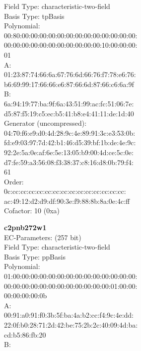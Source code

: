 Field Type: characteristic-two-field\\
Basis Type: tpBasis\\
Polynomial:\\
    00:80:00:00:00:00:00:00:00:00:00:00:00:00:00:\\
    00:00:00:00:00:00:00:00:00:00:00:10:00:00:00:\\
    01\\
A:   \\
    01:23:87:74:66:6a:67:76:6d:66:76:f7:78:e6:76:\\
    b6:69:99:17:66:66:e6:87:66:6d:87:66:c6:6a:9f\\
B:   \\
    6a:94:19:77:ba:9f:6a:43:51:99:ac:fc:51:06:7e:\\
    d5:87:f5:19:c5:ec:b5:41:b8:e4:41:11:de:1d:40\\
Generator (uncompressed):\\
    04:70:f6:e9:d0:4d:28:9c:4e:89:91:3c:e3:53:0b:\\
    fd:e9:03:97:7d:42:b1:46:d5:39:bf:1b:de:4e:9c:\\
    92:2e:5a:0e:af:6e:5e:13:05:b9:00:4d:ce:5c:0e:\\
    d7:fe:59:a3:56:08:f3:38:37:c8:16:d8:0b:79:f4:\\
    61\\
Order: \\
    0c:cc:cc:cc:cc:cc:cc:cc:cc:cc:cc:cc:cc:cc:cc:\\
    ac:49:12:d2:d9:df:90:3e:f9:88:8b:8a:0e:4c:ff\\
Cofactor:  10 (0xa)\\
\item \textbf{ c2pnb272w1 }\\
EC-Parameters: (257 bit)\\
Field Type: characteristic-two-field\\
Basis Type: ppBasis\\
Polynomial:\\
    01:00:00:00:00:00:00:00:00:00:00:00:00:00:00:\\
    00:00:00:00:00:00:00:00:00:00:00:00:01:00:00:\\
    00:00:00:00:0b\\
A:   \\
    00:91:a0:91:f0:3b:5f:ba:4a:b2:cc:f4:9c:4e:dd:\\
    22:0f:b0:28:71:2d:42:be:75:2b:2c:40:09:4d:ba:\\
    cd:b5:86:fb:20\\
B:   \\
